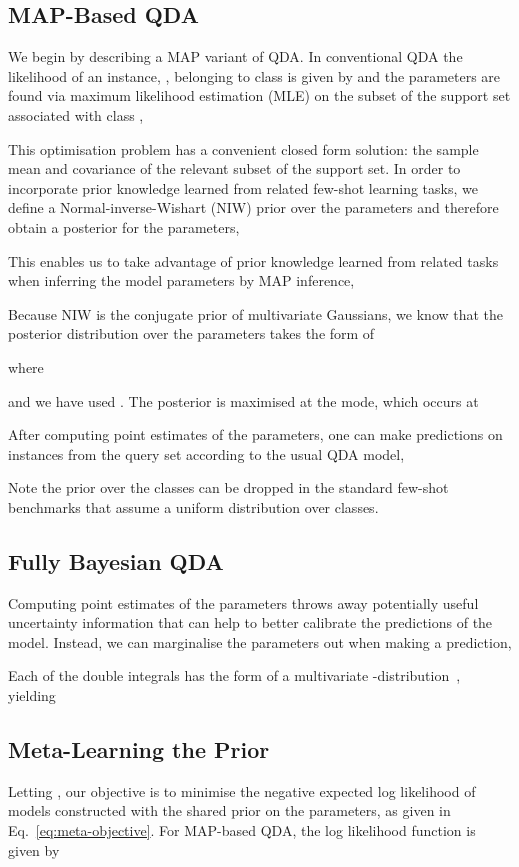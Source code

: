 \documentclass[10pt,twocolumn,letterpaper]{article}
\begin{document}
\subsection{MAP-Based QDA}\label{sec:mqdaMAP}
\label{sec:method}
We begin by describing a MAP variant of QDA. In conventional QDA the likelihood of an instance, , belonging to class  is given by 
and the parameters are found via maximum likelihood estimation (MLE) on the subset of the support set associated with class ,

This optimisation problem has a convenient closed form solution: the sample mean and covariance of the relevant subset of the support set. In order to incorporate prior knowledge learned from related few-shot learning tasks, we define a Normal-inverse-Wishart (NIW) prior \cite{murphy2012machine} over the parameters and therefore obtain a posterior for the parameters,


This enables us to take advantage of prior knowledge learned from related tasks when inferring the model parameters by MAP inference,


Because NIW is the conjugate prior of multivariate Gaussians, we know that the posterior distribution over the parameters takes the form of

where

and we have used . The posterior is maximised at the mode, which occurs at


After computing point estimates of the parameters, one can make predictions on instances from the query set according to the usual QDA model,

Note the prior over the classes  can be dropped in the standard few-shot benchmarks that assume a uniform distribution over classes.

\subsection{Fully Bayesian QDA}\label{sec:mqdaFB}
Computing point estimates of the parameters throws away potentially useful uncertainty information that can help to better calibrate the predictions of the model. Instead, we can marginalise the parameters out when making a prediction,

Each of the double integrals has the form of a multivariate -distribution~\cite{murphy2012machine}, yielding


\subsection{Meta-Learning the Prior}
Letting , our objective is to minimise the negative expected log likelihood of models constructed with the shared prior on the parameters, as given in Eq.~\ref{eq:meta-objective}. For  MAP-based QDA, the log likelihood function is given by
\end{document}
